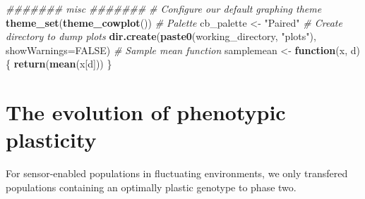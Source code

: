 \documentclass[]{book}
\newenvironment{Shaded}{\begin{snugshade}}{\end{snugshade}}
\newcommand{\CommentTok}[1]{\textcolor[rgb]{0.56,0.35,0.01}{\textit{#1}}}
\newcommand{\ControlFlowTok}[1]{\textcolor[rgb]{0.13,0.29,0.53}{\textbf{#1}}}
\newcommand{\DataTypeTok}[1]{\textcolor[rgb]{0.13,0.29,0.53}{#1}}
\newcommand{\KeywordTok}[1]{\textcolor[rgb]{0.13,0.29,0.53}{\textbf{#1}}}
\newcommand{\NormalTok}[1]{#1}
\newcommand{\OtherTok}[1]{\textcolor[rgb]{0.56,0.35,0.01}{#1}}
\newcommand{\StringTok}[1]{\textcolor[rgb]{0.31,0.60,0.02}{#1}}
\begin{document}
\begin{Shaded}
\begin{Highlighting}[]
\CommentTok{####### misc #######}
\CommentTok{# Configure our default graphing theme}
\KeywordTok{theme_set}\NormalTok{(}\KeywordTok{theme_cowplot}\NormalTok{())}
\CommentTok{# Palette}
\NormalTok{cb_palette <-}\StringTok{ "Paired"}
\CommentTok{# Create directory to dump plots}
\KeywordTok{dir.create}\NormalTok{(}\KeywordTok{paste0}\NormalTok{(working_directory, }\StringTok{"plots"}\NormalTok{), }\DataTypeTok{showWarnings=}\OtherTok{FALSE}\NormalTok{)}
\CommentTok{# Sample mean function}
\NormalTok{samplemean <-}\StringTok{ }\ControlFlowTok{function}\NormalTok{(x, d) \{}
  \KeywordTok{return}\NormalTok{(}\KeywordTok{mean}\NormalTok{(x[d]))}
\NormalTok{\}}
\end{Highlighting}
\end{Shaded}

\hypertarget{the-evolution-of-phenotypic-plasticity-1}{%
\section{The evolution of phenotypic plasticity}\label{the-evolution-of-phenotypic-plasticity-1}}

For sensor-enabled populations in fluctuating environments, we only transfered populations containing an optimally plastic genotype to phase two.
\end{document}
